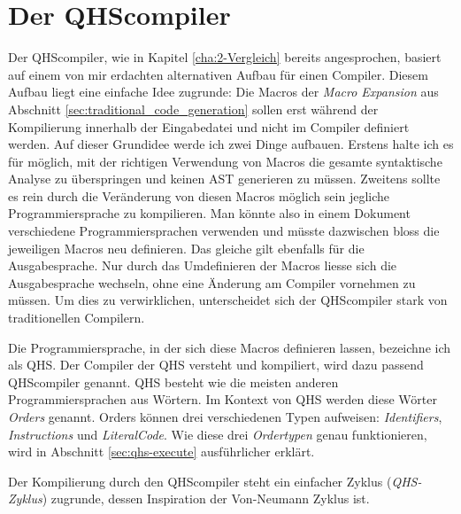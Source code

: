 \chapter{Der QHScompiler} \label{cha:4-QHS_Compiler}
Der QHScompiler, wie in Kapitel \ref{cha:2-Vergleich} bereits angesprochen, basiert auf einem von mir erdachten alternativen Aufbau für einen Compiler. Diesem Aufbau liegt eine einfache Idee zugrunde:
Die Macros der \textit{Macro Expansion} aus Abschnitt \ref{sec:traditional_code_generation} sollen erst während der Kompilierung innerhalb der Eingabedatei und nicht im Compiler definiert werden. 
Auf dieser Grundidee werde ich zwei Dinge aufbauen. Erstens halte ich es für möglich, mit der richtigen Verwendung von Macros die gesamte syntaktische Analyse zu überspringen und keinen AST generieren zu müssen.
Zweitens sollte es rein durch die Veränderung von diesen Macros möglich sein jegliche Programmiersprache zu kompilieren. Man könnte also in einem Dokument verschiedene Programmiersprachen verwenden und
müsste dazwischen bloss die jeweiligen Macros neu definieren. Das gleiche gilt ebenfalls für die Ausgabesprache.
Nur durch das Umdefinieren der Macros liesse sich die Ausgabesprache wechseln, ohne eine Änderung am Compiler vornehmen zu müssen.
Um dies zu verwirklichen, unterscheidet sich der QHScompiler stark von traditionellen Compilern.

Die Programmiersprache, in der sich diese Macros definieren lassen, bezeichne ich als QHS. Der Compiler der QHS versteht und kompiliert, wird dazu passend QHScompiler genannt.
QHS besteht wie die meisten anderen Programmiersprachen aus Wörtern. Im Kontext von QHS werden diese Wörter \textit{Orders} genannt.
Orders können drei verschiedenen Typen aufweisen: \textit{Identifiers}, \textit{Instructions} und \textit{LiteralCode}.
Wie diese drei \textit{Ordertypen} genau funktionieren, wird in Abschnitt \ref{sec:qhs-execute} ausführlicher erklärt.

Der Kompilierung durch den QHScompiler steht ein einfacher Zyklus (\textit{QHS-Zyklus}) zugrunde, dessen Inspiration der Von-Neumann Zyklus ist.


